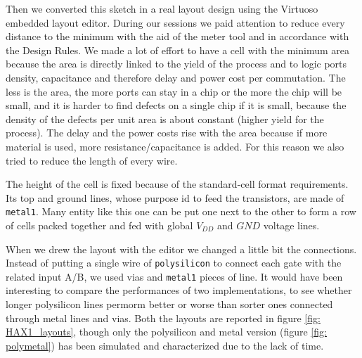 \documentclass[a4paper]{article}
\begin{document}
Then we converted this sketch in a real layout design using the Virtuoso embedded layout editor. During our sessions we paid attention to reduce every distance to the minimum with the aid of the meter tool and in accordance with the Design Rules. We made a lot of effort to have a cell with the minimum area because the area is directly linked to the yield of the process and to logic ports density, capacitance and therefore delay and power cost per commutation. The less is the area, the more ports can stay in a chip or the more the chip will be small, and it is harder to find defects on a single chip if it is small, because the density of the defects per unit area is about constant (higher yield for the process). The delay and the power costs rise with the area because if more material is used, more resistance/capacitance is added. For this reason we also tried to reduce the length of every wire.

The height of the cell is fixed because of the standard-cell format requirements. Its top and ground lines, whose purpose id to feed the transistors, are made of \texttt{metal1}. Many entity like this one can be put one next to the other to form a row of cells packed together and fed with global $V_{DD}$ and $GND$ voltage lines.

When we drew the layout with the editor we changed a little bit the connections. Instead of putting a single wire of \texttt{polysilicon} to connect each gate with the related input A/B, we used vias and \texttt{metal1} pieces of line. It would have been interesting to compare the performances of two implementations, to see whether longer polysilicon lines permorm better or worse than sorter ones connected through metal lines and vias. Both the layouts are reported in figure \ref{fig: HAX1_layouts}, though only the polysilicon and metal version (figure \ref{fig: polymetal}) has been simulated and characterized due to the lack of time.
\end{document}
